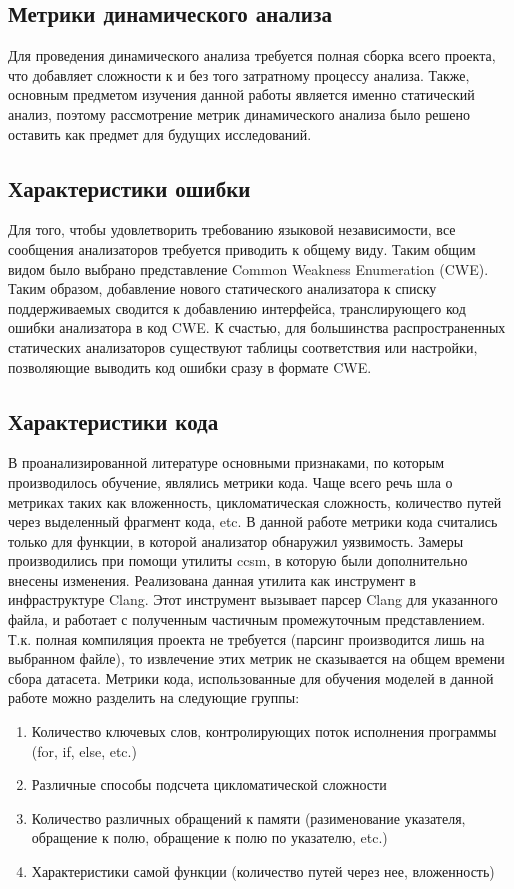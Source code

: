 \subsection{Метрики динамического анализа}
Для проведения динамического анализа требуется полная сборка всего проекта, что добавляет сложности к и без того затратному процессу анализа. Также, основным предметом изучения данной работы является именно статический анализ, поэтому рассмотрение метрик динамического анализа было решено оставить как предмет для будущих исследований.

\subsection{Характеристики ошибки}
\label{sec:Err-to-CWE} 
Для того, чтобы удовлетворить требованию языковой независимости, все сообщения анализаторов требуется приводить к общему виду. Таким общим видом было выбрано представление Common Weakness Enumeration (CWE)\cite{CWE-doc}. Таким образом, добавление нового статического анализатора к списку поддерживаемых сводится к добавлению интерфейса, транслирующего код ошибки анализатора в код CWE. К счастью, для большинства распространенных статических анализаторов существуют таблицы соответствия или настройки, позволяющие выводить код ошибки сразу в формате CWE.

\subsection{Характеристики кода}
В проанализированной литературе основными признаками, по которым производилось обучение, являлись метрики кода. Чаще всего речь шла о метриках таких как вложенность, цикломатическая сложность, количество путей через выделенный фрагмент кода, etc. В данной работе метрики кода считались только для функции, в которой анализатор обнаружил уязвимость. Замеры производились при помощи утилиты ccsm\cite{CCSM}, в которую были дополнительно внесены изменения. Реализована данная утилита как инструмент в инфраструктуре Clang\cite{Clang}. Этот инструмент вызывает парсер Clang для указанного файла, и работает с полученным частичным промежуточным представлением. Т.к. полная компиляция проекта не требуется (парсинг производится лишь на выбранном файле), то извлечение этих метрик не сказывается на общем времени сбора датасета. Метрики кода, использованные для обучения моделей в данной работе можно разделить на следующие группы:

\begin{enumerate}
    \item Количество ключевых слов, контролирующих поток исполнения программы (for, if, else, etc.)
    \item Различные способы подсчета цикломатической сложности
    \item Количество различных обращений к памяти (разименование указателя, обращение к полю, обращение к полю по указателю, etc.)
    \item Характеристики самой функции (количество путей через нее, вложенность)
\end{enumerate}

